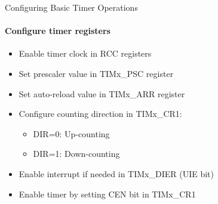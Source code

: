 \begin{KR}{Configuring Basic Timer Operations}
\paragraph{Configure timer registers}
\begin{itemize}
    \item Enable timer clock in RCC registers
    \item Set prescaler value in TIMx\_PSC register
    \item Set auto-reload value in TIMx\_ARR register
    \item Configure counting direction in TIMx\_CR1:
    \begin{itemize}
        \item DIR=0: Up-counting
        \item DIR=1: Down-counting
    \end{itemize}
    \item Enable interrupt if needed in TIMx\_DIER (UIE bit)
    \item Enable timer by setting CEN bit in TIMx\_CR1
\end{itemize}
\end{KR}

